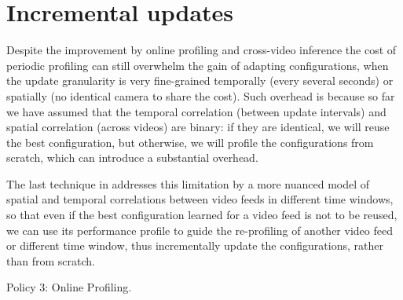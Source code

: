 \section{Incremental updates}
\label{sec:transfer}

Despite the improvement by online profiling and cross-video inference
the cost of periodic profiling can still overwhelm the gain of adapting
configurations, when the update granularity is very fine-grained 
temporally (every several seconds) or spatially (no identical camera to
share the cost).
Such overhead is because so far we have assumed that the temporal 
correlation (between update intervals) and spatial correlation (across
videos) are binary: if they are identical, we will reuse the best 
configuration, but otherwise, we will profile the configurations from
scratch, which can introduce a substantial overhead.

The last technique in \name addresses this limitation by a more nuanced
model of spatial and temporal correlations between video feeds in 
different time windows, so that even if the best configuration learned 
for a video feed is not to be reused, we can use its performance profile
to guide the re-profiling of another video feed or different time
window, thus incrementally update the configurations, rather than from
scratch.

\begin{algorithm}[t!]
    \small
	\DontPrintSemicolon
	\caption{Policy 3: Online Profiling.}
	\label{alg:policy3}
\end{algorithm}